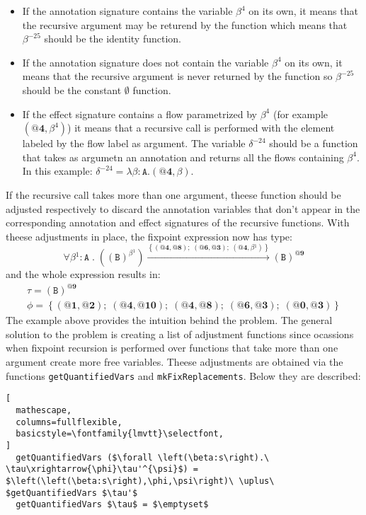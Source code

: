 \documentclass[8pt]{extarticle}
\begin{document}
\begin{itemize}
\item If the annotation signature contains the variable $\beta^{4}$ on its own, it means that the recursive argument may be returend by the function which means that $\beta^{-25}$ should be the identity function.
\item If the annotation signature does not contain the variable $\beta^{4}$ on its own, it means that the recursive argument is never returned by the function so $\beta^{-25}$ should be the constant $\emptyset$ function.
\item If the effect signature contains a flow parametrized by $\beta^{4}$ (for example $\left(\mathbf{@4},\beta^{4}\right)$) it means that a recursive call is performed with the element labeled by the flow label as argument. The variable $\delta^{-24}$ should be a function that takes as argumetn an annotation and returns all the flows containing $\beta^4$. In this example: $\delta^{-24}=\lambda\beta:\mathtt{A}.\left(\mathbf{@4},\beta\right)$.
\end{itemize}
If the recursive call takes more than one argument, theese function should be adjusted respectively to discard the annotation variables that don't appear in the corresponding annotation and effect signatures of the recursive functions. With theese adjustments in place, the fixpoint expression now has type:
\[
\forall{}\beta{}^{1}:\mathtt{A}\;{}.\;{}\left(\left(\mathtt{B}\right)^{\beta{}^{1}}\right)\xrightarrow{\left\{\left(\textbf{@4},\textbf{@8}\right);\;{}\left(\textbf{@6},\textbf{@3}\right);\;{}\left(\textbf{@4},\beta{}^{1}\right)\right\}}\left(\mathtt{B}\right)^{\textbf{@9}}
\]
and the whole expression results in:
\[
\begin{array}{c}
\tau=\left(\mathtt{B}\right)^{\textbf{@9}} \\
\phi=\left\{\left(\textbf{@1},\textbf{@2}\right);\;{}\left(\textbf{@4},\textbf{@10}\right);\;{}\left(\textbf{@4},\textbf{@8}\right);\;{}\left(\textbf{@6},\textbf{@3}\right);\;{}\left(\textbf{@0},\textbf{@3}\right)\right\}
\end{array}
\]
The example above provides the intuition behind the problem. The general solution to the problem is creating a list of adjustment functions since ocassions when fixpoint recursion is performed over functions that take more than one argument create more free variables. Theese adjustments are obtained via the functions \verb+getQuantifiedVars+ and \verb+mkFixReplacements+. Below they are described:
\begin{lstlisting}[
  mathescape,
  columns=fullflexible,
  basicstyle=\fontfamily{lmvtt}\selectfont,
]
  getQuantifiedVars ($\forall \left(\beta:s\right).\ \tau\xrightarrow{\phi}\tau'^{\psi}$) = $\left(\left(\beta:s\right),\phi,\psi\right)\ \uplus\ $getQuantifiedVars $\tau'$
  getQuantifiedVars $\tau$ = $\emptyset$
\end{lstlisting}
\end{document}
